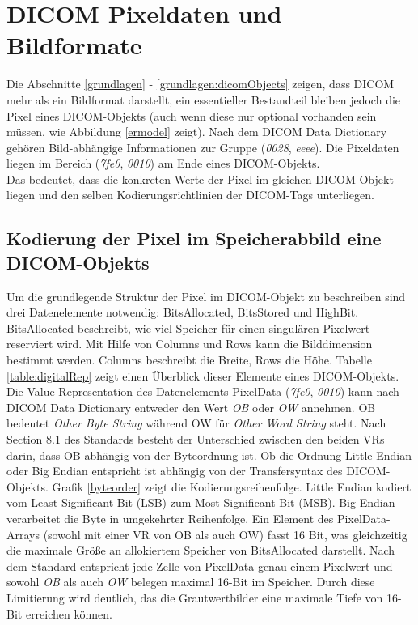 \FloatBarrier
\section{DICOM Pixeldaten und Bildformate}

Die Abschnitte \ref{grundlagen} - \ref{grundlagen:dicomObjects} zeigen, dass DICOM mehr als ein Bildformat darstellt, ein essentieller Bestandteil bleiben jedoch die Pixel eines DICOM-Objekts (auch wenn diese nur optional vorhanden sein müssen, wie Abbildung \ref{ermodel} zeigt). Nach dem DICOM Data Dictionary gehören Bild-abhängige Informationen zur Gruppe (\textit{0028}, \textit{eeee}).
Die Pixeldaten liegen im Bereich (\textit{7fe0}, \textit{0010}) am Ende eines DICOM-Objekts.\\
Das bedeutet, dass die konkreten Werte der Pixel im gleichen DICOM-Objekt liegen und den selben Kodierungsrichtlinien der DICOM-Tags unterliegen.

\FloatBarrier
\subsection{Kodierung der Pixel im Speicherabbild eine DICOM-Objekts} \label{pixelkodierung}

Um die grundlegende Struktur der Pixel im DICOM-Objekt zu beschreiben sind drei Datenelemente notwendig: BitsAllocated, BitsStored und HighBit. BitsAllocated beschreibt, wie viel Speicher für einen singulären Pixelwert reserviert wird. Mit Hilfe von Columns und Rows kann die Bilddimension bestimmt werden. Columns beschreibt die Breite, Rows die Höhe. Tabelle \ref{table:digitalRep} zeigt einen Überblick dieser Elemente eines DICOM-Objekts. Die Value Representation des Datenelements PixelData (\textit{7fe0}, \textit{0010}) kann nach DICOM Data Dictionary entweder den Wert \textit{OB} oder \textit{OW} annehmen. OB bedeutet \textit{Other Byte String} während OW für \textit{Other Word String} steht. Nach Section 8.1 des Standards\cite{dicom:structure} besteht der Unterschied zwischen den beiden VRs darin, dass OB abhängig von der Byteordnung ist. Ob die Ordnung Little Endian oder Big Endian entspricht ist abhängig von der Transfersyntax des DICOM-Objekts.
Grafik \ref{byteorder} zeigt die Kodierungsreihenfolge. Little Endian kodiert vom Least Significant Bit (LSB) zum Most Significant Bit (MSB). Big Endian verarbeitet die Byte in umgekehrter Reihenfolge. Ein Element des PixelData-Arrays (sowohl mit einer VR von OB als auch OW) fasst 16 Bit, was gleichzeitig die maximale Größe an allokiertem Speicher von BitsAllocated darstellt. Nach dem Standard entspricht jede Zelle von PixelData genau einem Pixelwert \cite[8.1.1]{dicom:structure} und sowohl \textit{OB} als auch \textit{OW} belegen maximal 16-Bit im Speicher. Durch diese Limitierung wird deutlich, das die Grautwertbilder eine maximale Tiefe von 16-Bit erreichen können.

